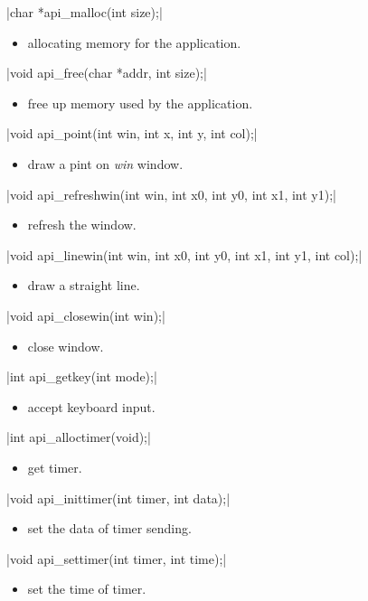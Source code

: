 \documentclass{swfcthesis}
\begin{document}
\csingle|char *api_malloc(int size);|
\begin{itemize}
\item allocating memory for the application.
\end{itemize}

\csingle|void api_free(char *addr, int size);|
\begin{itemize}
\item free up memory used by the application.
\end{itemize}

\csingle|void api_point(int win, int x, int y, int col);|
\begin{itemize}
\item draw a pint on \emph{win} window.
\end{itemize}

\csingle|void api_refreshwin(int win, int x0, int y0, int x1, int y1);|
\begin{itemize}
\item refresh the window.
\end{itemize}

\csingle|void api_linewin(int win, int x0, int y0, int x1, int y1, int col);|
\begin{itemize}
\item draw a straight line.
\end{itemize}

\csingle|void api_closewin(int win);|
\begin{itemize}
\item close window.
\end{itemize}

\csingle|int api_getkey(int mode);|
\begin{itemize}
\item accept keyboard input.
\end{itemize}

\csingle|int api_alloctimer(void);|
\begin{itemize}
\item get timer.
\end{itemize}

\csingle|void api_inittimer(int timer, int data);|
\begin{itemize}
\item set the data of timer sending.
\end{itemize}

\csingle|void api_settimer(int timer, int time);|
\begin{itemize}
\item set the time of timer.
\end{itemize}
\end{document}
